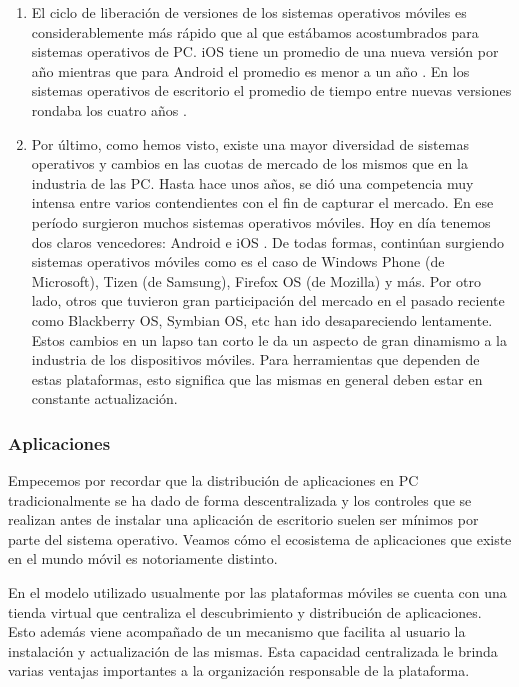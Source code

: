 \begin{enumerate}
\begin{itemize}
    \end{itemize}
\item El ciclo de liberación de versiones de los sistemas operativos móviles es considerablemente más rápido que al que estábamos acostumbrados para sistemas operativos de PC. iOS tiene un promedio de una nueva versión por año \cite{historyOfiOs} mientras que para Android el promedio es menor a un año \cite{androidVersionHistory}. En los sistemas operativos de escritorio el promedio de tiempo entre nuevas versiones rondaba los cuatro años \cite{WindowsHistory}.
\item Por último, como hemos visto, existe una mayor diversidad de sistemas operativos y cambios en las cuotas de mercado de los mismos que en la industria de las PC. Hasta hace unos años, se dió una competencia muy intensa entre varios contendientes con el fin de capturar el mercado. En ese período surgieron muchos sistemas operativos móviles. Hoy en día tenemos dos claros vencedores: Android e iOS \cite{gartnerSales}. De todas formas, continúan surgiendo sistemas operativos móviles como es el caso de Windows Phone (de Microsoft), Tizen (de Samsung), Firefox OS (de Mozilla) y más. Por otro lado, otros que tuvieron gran participación del mercado en el pasado reciente como Blackberry OS, Symbian OS, etc han ido desapareciendo lentamente. Estos cambios en un lapso tan corto le da un aspecto de gran dinamismo a la industria de los dispositivos móviles. Para herramientas que dependen de estas plataformas, esto significa que las mismas en general deben estar en constante actualización.
\end{enumerate}

\subsubsection{Aplicaciones}
Empecemos por recordar que la distribución de aplicaciones en PC tradicionalmente se ha dado de forma descentralizada y los controles que se realizan antes de instalar una aplicación de escritorio suelen ser mínimos por parte del sistema operativo. Veamos cómo el ecosistema de aplicaciones que existe en el mundo móvil es notoriamente distinto.

En el modelo utilizado usualmente por las plataformas móviles se cuenta con una tienda virtual que centraliza el descubrimiento y distribución de aplicaciones. Esto además viene acompañado de un mecanismo que facilita al usuario la instalación y actualización de las mismas. Esta capacidad centralizada le brinda varias ventajas importantes a la organización responsable de la plataforma.

